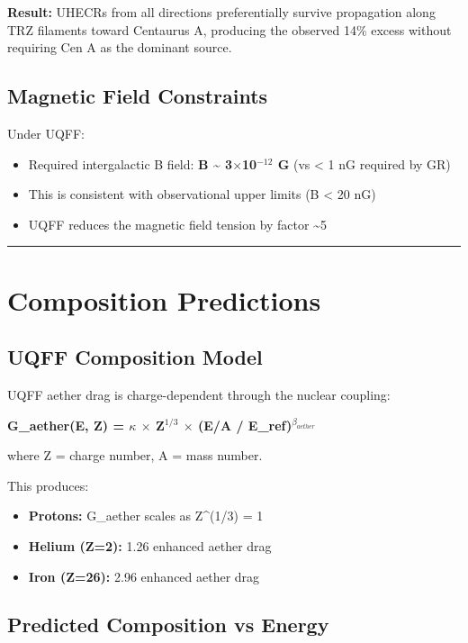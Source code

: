 \documentclass[12pt,a4paper]{article}
\begin{document}
\textbf{Result:} UHECRs from all directions preferentially survive propagation along TRZ filaments toward Centaurus A, producing the observed 14\% excess without requiring Cen A as the dominant source.

\subsection{Magnetic Field Constraints}

Under UQFF:

\begin{itemize}
  \item Required intergalactic B field: \textbf{B \textasciitilde{} 3$\times$10$^{-12}$ G} (vs < 1 nG required by GR)
  \item This is consistent with observational upper limits (B < 20 nG)
  \item UQFF reduces the magnetic field tension by factor \textasciitilde{}5
\end{itemize}

\medskip\hrule\medskip

\section{Composition Predictions}

\subsection{UQFF Composition Model}

UQFF aether drag is charge-dependent through the nuclear coupling:

\textbf{G\_aether(E, Z) = $\kappa$ $\times$ Z$^{1/3}$ $\times$ (E/A / E\_ref)$^{\beta_{aether}}$}

where Z = charge number, A = mass number.

This produces:

\begin{itemize}
  \item \textbf{Protons:} G\_aether scales as Z\^{}(1/3) = 1
  \item \textbf{Helium (Z=2):} 1.26 enhanced aether drag
  \item \textbf{Iron (Z=26):} 2.96 enhanced aether drag
\end{itemize}

\subsection{Predicted Composition vs Energy}
\end{document}
